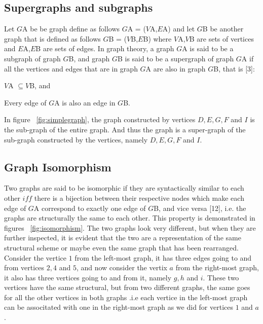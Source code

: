 \subsection{Supergraphs and subgraphs}
Let $G${\tiny A} be be graph define as follows $G${\tiny A} = ($V${\tiny A},$E${\tiny A}) and let $G${\tiny B} be another graph that is defined as follows $G${\tiny B} = ($V${\tiny B},$E${\tiny B}) where $V${\tiny A},$V${\tiny B} are sets of vertices and $E${\tiny A},$E${\tiny B} are sets of edges.
In graph theory, a graph $G${\tiny A} is said to be a subgraph of graph $G${\tiny B}, and graph $G${\tiny B} is said to be a supergraph of graph $G${\tiny A} if all the vertices and edges that are in graph $G${\tiny A} are also in graph $G${\tiny B}, that is [3]:

\begin{myEnumerate}
  \item $V${\tiny A} $ \subseteq V${\tiny B}, and
  \item Every edge of $G${\tiny A} is also an edge in $G${\tiny B}.
\end{myEnumerate}

In figure  ~\ref{fig:simplegraph}, the graph constructed by vertices $D,E,G,F$ and $I$ is the sub-graph of the entire graph. And thus the graph is a super-graph of the sub-graph constructed by the vertices, namely $D,E,G,F$ and $I$.

\subsection{Graph Isomorphism}
Two graphs are said to be isomorphic if they are syntactically similar to each other $iff$ there is a bijection between their respective nodes which make each edge of $G${\tiny A} correspond to exactly one edge of $G${\tiny B}, and vice versa [12], i.e. the graphs are structurally the same to each other. This property is demonstrated in figures ~\ref{fig:isomorphism}. 
\newpage
The two graphs look very different, but when they are further inspected, it is evident that the two are a representation of the same structural scheme or maybe even the same graph that has been rearranged. \newline\newline Consider the vertice $1$ from the left-most graph, it has three edges going to and from vertices $2,4$ and $5$, and now consider the vertix $a$ from the right-most graph, it also has three vertices going to and from it, namely $g,h$ and $i$. These two vertices have the same structural, but from two different graphs, the same goes for all the other vertices in both graphs .i.e each vertice in the left-most graph can be associtated with one in the right-most graph as we did for vertices $1$ and $a$.

